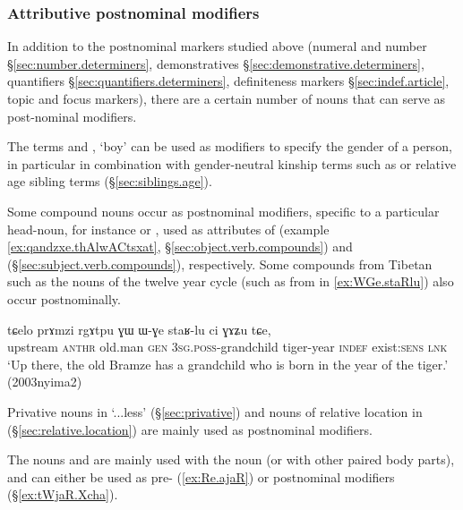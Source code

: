\subsubsection{Attributive postnominal modifiers} \label{ex:attributive.postnominal}
In addition to the postnominal markers studied above (numeral and number §\ref{sec:number.determiners}, demonstratives §\ref{sec:demonstrative.determiners}, quantifiers §\ref{sec:quantifiers.determiners}, definiteness markers §\ref{sec:indef.article}, topic and focus markers), there are a certain number of nouns that can serve as post-nominal modifiers.

The terms  and , `boy' can be used as modifiers to specify the gender of a person, in particular in combination with gender-neutral kinship terms such as  or relative age sibling terms (§\ref{sec:siblings.age}).

Some compound nouns occur as postnominal modifiers, specific to a particular head-noun, for instance  or , used as attributes of   (example \ref{ex:qandzxe.thAlwACtsxat}, §\ref{sec:object.verb.compounds}) and  (§\ref{sec:subject.verb.compounds}), respectively.  Some compounds from Tibetan such as the nouns of the twelve year cycle (such as  from  in \ref{ex:WGe.staRlu}) also occur postnominally.

\begin{exe}
\ex \label{ex:WGe.staRlu}
\gll tɕelo prɤmzi rgɤtpu ɣɯ ɯ-ɣe staʁ-lu ci ɣɤʑu tɕe, \\
upstream  \textsc{anthr} old.man \textsc{gen} \textsc{3sg}.\textsc{poss}-grandchild tiger-year \textsc{indef} exist:\textsc{sens} \textsc{lnk} \\
\glt `Up there, the old Bramze has a grandchild who is born in the year of the tiger.' (2003nyima2)
\end{exe}

Privative nouns in  `...less' (§\ref{sec:privative}) and nouns of relative location in  (§\ref{sec:relative.location}) are mainly used as postnominal modifiers.

The nouns  and  are mainly used with the noun  (or with other paired body parts), and can either be used as pre- (\ref{ex:Re.ajaR}) or postnominal modifiers (§\ref{ex:tWjaR.Xcha}).

